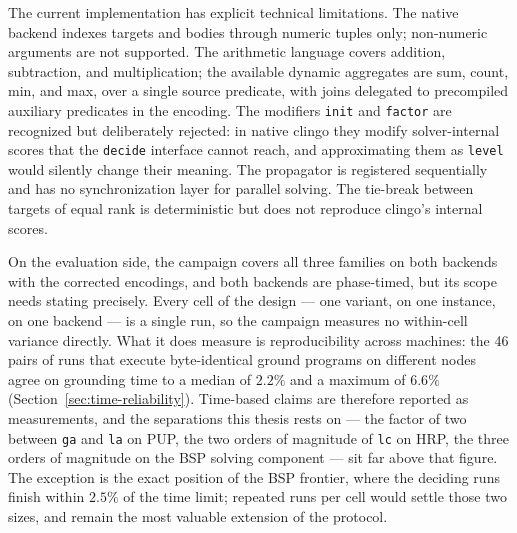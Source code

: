 The current implementation has explicit technical limitations. The native backend indexes targets and bodies through numeric tuples only; non-numeric arguments are not supported. The arithmetic language covers addition, subtraction, and multiplication; the available dynamic aggregates are sum, count, min, and max, over a single source predicate, with joins delegated to precompiled auxiliary predicates in the encoding. The modifiers \texttt{init} and \texttt{factor} are recognized but deliberately rejected: in native clingo they modify solver-internal scores that the \texttt{decide} interface cannot reach, and approximating them as \texttt{level} would silently change their meaning. The propagator is registered sequentially and has no synchronization layer for parallel solving. The tie-break between targets of equal rank is deterministic but does not reproduce clingo's internal scores.

On the evaluation side, the campaign covers all three families on both backends with the corrected encodings, and both backends are phase-timed, but its scope needs stating precisely. Every cell of the design --- one variant, on one instance, on one backend --- is a single run, so the campaign measures no within-cell variance directly. What it does measure is reproducibility across machines: the 46 pairs of runs that execute byte-identical ground programs on different nodes agree on grounding time to a median of $2.2\%$ and a maximum of $6.6\%$ (Section~\ref{sec:time-reliability}). Time-based claims are therefore reported as measurements, and the separations this thesis rests on --- the factor of two between \texttt{ga} and \texttt{la} on PUP, the two orders of magnitude of \texttt{lc} on HRP, the three orders of magnitude on the BSP solving component --- sit far above that figure. The exception is the exact position of the BSP frontier, where the deciding runs finish within $2.5\%$ of the time limit; repeated runs per cell would settle those two sizes, and remain the most valuable extension of the protocol.

